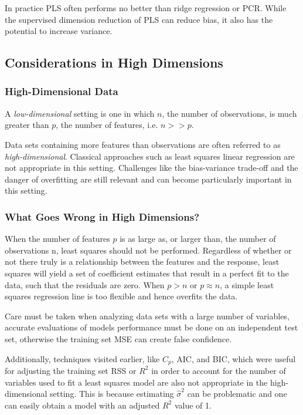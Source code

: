 \documentclass{article}
\numberwithin{equation}{section}
\begin{document}
\begin{enumerate}
In practice PLS often performs no better than ridge regression or PCR. While the supervised dimension reduction of PLS can reduce bias, it also has the potential to increase variance.

\subsection{Considerations in High Dimensions}
\subsubsection{High-Dimensional Data}

A \textit{low-dimensional} setting is one in which $n$, the number of observations, is much greater than $p$, the number of features, i.e. $n>>p$.

Data sets containing more features than observations are often referred to as \textit{high-dimensional}. Classical approaches such as least squares linear regression are not appropriate in this setting. Challenges like the bias-variance trade-off and the danger of overfitting are still relevant and can become particularly important in this setting.


\subsubsection{What Goes Wrong in High Dimensions?}

When the number of features $p$ is as large as, or larger than, the number of observations n, least squares should not be performed. Regardless of whether or not there truly is a relationship between the features and the response, least squares will yield a set of coefficient estimates that result in a perfect fit to the data, such that the residuals are zero.  When $p>n$ or $p \approx n$, a simple least squares regression line is too flexible and hence overfits the data.

Care must be taken when analyzing data sets with a large number of variables, accurate evaluations of models performance must be done on an independent test set, otherwise the training set MSE can create false confidence.

Additionally, techniques visited earlier, like $C_p$, AIC, and BIC, which were useful for adjusting the training set RSS or $R^2$ in order to account for the number of variables used to fit a least squares model are also not appropriate in the high-dimensional setting. This is because estimating $\hat\sigma^2$ can be problematic and one can easily obtain a model with an adjusted $R^2$ value of 1.


\end{enumerate}
\end{document}
